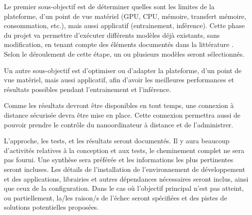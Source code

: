 ﻿\par Le premier sous-objectif est de déterminer quelles sont les limites de la plateforme, d'un point de vue matériel (GPU, CPU, mémoire, transfert mémoire, consommation, etc.), mais aussi applicatif (entrainement, inférence). Cette phase du projet va permettre d'exécuter différents modèles déjà existants, sans  modification, en tenant compte des éléments documentés dans la littérature \cite{nguyen_mavnet_2019} \cite{jia_real-time_2020} \cite{nvidia_jetson_2019-1}. Selon le déroulement de cette étape, un ou plusieurs modèles seront sélectionnés. 
\par Un autre sous-objectif est d'optimiser ou d'adapter la plateforme, d'un point de vue matériel, mais aussi applicatif, afin d'avoir les meilleures performances et résultats possibles pendant l'entrainement et l'inférence.
\par Comme les résultats devront être disponibles en tout temps, une connexion à distance sécurisée devra être mise en place. Cette connexion permettra aussi de pouvoir prendre le contrôle du nanoordinateur à distance et de l'administrer.
\par L'approche, les tests, et les résultats seront documentés. Il y aura beaucoup d'activités relatives à la conception et aux tests, le cheminement complet ne sera pas fourni. Une synthèse sera préférée et les informations les plus pertinentes seront incluses. Les détails de l'installation de l'environnement de développement et des applications, librairies et autres dépendances nécessaires seront inclus, ainsi que ceux de la configuration. Dans le cas où l'objectif principal n'est pas atteint, ou partiellement, la/les raison/s de l'échec seront spécifiées et des pistes de solutions potentielles proposées.